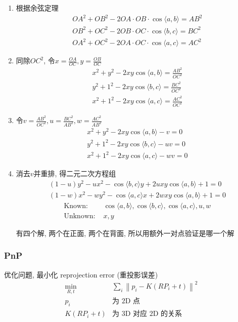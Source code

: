 \begin{enumerate}
    \item 根据余弦定理
    \begin{align*}
        OA^{2}+OB^{2}-2 OA \cdot OB \cdot \cos \langle a, b\rangle=AB^{2} \\
        OB^{2}+OC^{2}-2 OB \cdot OC \cdot \cos \langle b, c\rangle=BC^{2} \\
        OA^{2}+OC^{2}-2 OA \cdot OC \cdot \cos \langle a, c\rangle=AC^{2}
    \end{align*}
    \item 同除$OC^2$, 令$x=\frac{OA}{OC}, y=\frac{OB}{OC}$
    \begin{align*}
        x^2+y^2-2xy\cos \langle a,b \rangle=\frac{AB^2}{OC^2}\\
        y^2+1^2-2xy\cos \langle b,c \rangle=\frac{BC^2}{OC^2}\\
        x^2+1^2-2xy\cos \langle a,c \rangle=\frac{AC^2}{OC^2}
    \end{align*}
    \item 令$v=\frac{AB^2}{OC^2}, u=\frac{BC^2}{AB^2}, w=\frac{AC^2}{AB^2}$
    \begin{align*}
        x^2+y^2-2xy\cos \langle a,b \rangle-v=0\\
        y^2+1^2-2xy\cos \langle b,c \rangle-uv=0\\
        x^2+1^2-2xy\cos \langle a,c \rangle-wv=0
    \end{align*}
    \item 消去$v$并重排, 得二元二次方程组
    \begin{align*}
        (1-u)y^2-ux^2-\cos \langle b,c \rangle y+2uxy \cos \langle a,b \rangle +1=0\\
        (1-w)x^2-wy^2-\cos \langle a,c \rangle x+2wxy \cos \langle a,b \rangle +1=0
    \end{align*}
    \begin{align*}
        \text{Known: }& \cos \langle a,b \rangle, \cos \langle b,c \rangle, \cos \langle a,c \rangle, u, w\\
        \text{Unknown: }& x, y 
    \end{align*}

    有四个解, 两个在正面, 两个在背面, 所以用额外一对点验证是哪一个解
\end{enumerate}

\subsubsection{PnP}
优化问题, 最小化 reprojection error (重投影误差)
\begin{align*}
    \min_{R,t}&\sum_i \left\| p_i-K(RP_i+t) \right\|^2\\
    p_i&\text{为 2D 点}\\
    K(RP_i+t)&\text{为 3D 对应 2D 的关系}
\end{align*}

